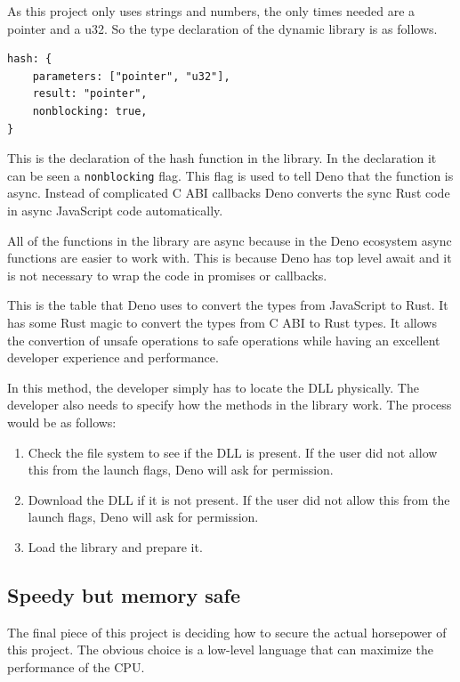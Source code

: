 \documentclass[10pt,journal,compsoc]{IEEEtran}
\begin{document}
As this project only uses strings and numbers, the only times needed are a pointer and a u32. So the type declaration of the dynamic library is as follows.

\begin{lstlisting}
hash: {
    parameters: ["pointer", "u32"],
    result: "pointer",
    nonblocking: true,
}
\end{lstlisting}

This is the declaration of the hash function in the library. In the declaration it can be seen a \verb|nonblocking| flag. This flag is used to tell Deno that the function is async. Instead of complicated C ABI callbacks Deno converts the sync Rust code in async JavaScript code automatically.

All of the functions in the library are async because in the Deno ecosystem async functions are easier to work with. This is because Deno has top level await and it is not necessary to wrap the code in promises or callbacks.

This is the table that Deno uses to convert the types from JavaScript to Rust. It has some Rust magic to convert the types from C ABI to Rust types. It allows the convertion of unsafe operations to safe operations while having an excellent developer experience and performance.

In this method, the developer simply has to locate the DLL physically. The developer also needs to specify how the methods in the library work.
The process would be as follows:

\begin{enumerate}
    \item Check the file system to see if the DLL is present. If the user did not allow this from the launch flags, Deno will ask for permission.
    \item Download the DLL if it is not present. If the user did not allow this from the launch flags, Deno will ask for permission.
    \item Load the library and prepare it.
\end{enumerate}


\subsection{Speedy but memory safe}

The final piece of this project is deciding how to secure the actual horsepower of this project. The obvious choice is a low-level language that can maximize the performance of the CPU.
\end{document}
